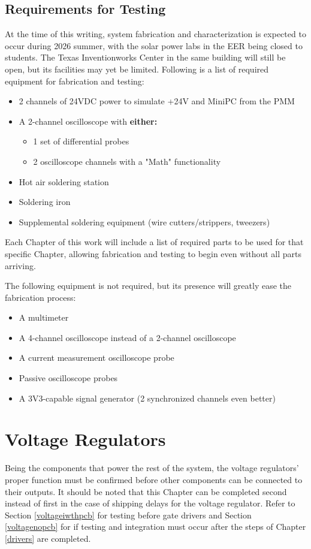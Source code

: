 \documentclass[]{report}
\begin{document}
\section{Requirements for Testing}
At the time of this writing, system fabrication and characterization is expected to occur during 2026 summer, with the solar power labs in the EER being closed to students. The Texas Inventionworks Center in the same building will still be open, but its facilities may yet be limited. Following is a list of required equipment for fabrication and testing: 
\begin{itemize}
	\item 2 channels of 24VDC power to simulate +24V and MiniPC from the PMM
	\item A 2-channel oscilloscope with \textbf{either:} 
	\begin{itemize}
		\item 1 set of differential probes
		\item 2 oscilloscope channels with a "Math" functionality
	\end{itemize}
	\item Hot air soldering station
	\item Soldering iron
	\item Supplemental soldering equipment (wire cutters/strippers, tweezers)
\end{itemize}
Each Chapter of this work will include a list of required parts to be used for that specific Chapter, allowing fabrication and testing to begin even without all parts arriving. \par
The following equipment is not required, but its presence will greatly ease the fabrication process:
\begin{itemize}
	\item A multimeter
	\item A 4-channel oscilloscope instead of a 2-channel oscilloscope
	\item A current measurement oscilloscope probe
	\item Passive oscilloscope probes
	\item A 3V3-capable signal generator (2 synchronized channels even better)
\end{itemize}
\chapter{Voltage Regulators}
Being the components that power the rest of the system, the voltage regulators' proper function must be confirmed before other components can be connected to their outputs. It should be noted that this Chapter can be completed second instead of first in the case of shipping delays for the voltage regulator. Refer to Section \ref{voltageiwthpcb} for testing before gate drivers and Section \ref{voltagenopcb} for if testing and integration must occur after the steps of Chapter \ref{drivers} are completed. 
\end{document}
